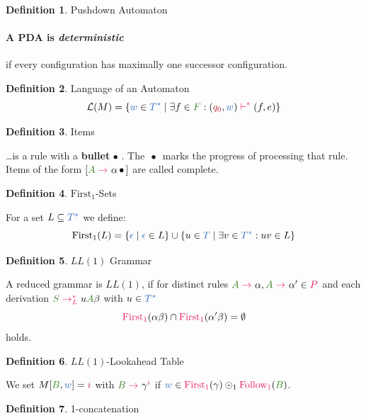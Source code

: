 \documentclass[10pt, landscape]{article}
\theoremstyle{definition}
\newtheorem{definition}{Definition}[section]
\newcommand{\Set}[1]{\textcolor{OliveGreen}{#1}}
\newcommand{\Op}[1]{\textcolor{WildStrawberry}{#1}}
\newcommand{\OneConcat}{\odot_{1}}
\newcommand{\Bul}{\,\bullet\,}
\newcommand{\LangOf}[1]{\mathcal{L} (#1)}
\newcommand{\derive}[1][]{\Op{\;\rightarrow_{#1}\;}}
\newcommand{\derives}[1][]{\Op{\;\rightarrow_{#1}^{*}\;}}
\newcommand{\nontermcolor}{OliveGreen}
\newcommand{\nt}[1]{\textcolor{\nontermcolor}{#1}}
\newcommand{\ntA}{\nt{A}}
\newcommand{\ntB}{\nt{B}}
\newcommand{\ntS}{\nt{S}}
\newcommand{\termcolor}{NavyBlue}
\newcommand{\terms}{\textcolor{\termcolor}{T}}
\newcommand{\termws}{\textcolor{\termcolor}{T^*}}
\newcommand{\termW}{\textcolor{\termcolor}{w}}
\newcommand{\termEps}{\textcolor{\termcolor}{\epsilon}}
\newcommand{\prodcolor}{WildStrawberry}
\newcommand{\prods}{\textcolor{\prodcolor}{P}}
\newcommand{\FollowOne}{\textcolor{\prodcolor}{\text{Follow}_{1}}}
\newcommand{\FirstOne}{\textcolor{\prodcolor}{\text{First}_{1}}}
\newcommand{\steps}{\Op{\;{\vdash}^{*}\;}}
\newcommand{\statecolor}{Maroon}
\newcommand{\stateQ}[1][]{\textcolor{\statecolor}{q_{#1}}}
\newcommand{\stateQZ}{\stateQ[0]}
\begin{document}
\begin{multicols*}{3}
\begin{definition}{Pushdown Automaton}
  \paragraph{A PDA is \textit{deterministic}} if every configuration has maximally one successor configuration.

\end{definition}

\begin{definition}{Language of an Automaton}
  \[
    \LangOf{M} = \{\termW \in \termws \mid \exists f \in \Set{F} : (\stateQZ, \termW) \steps (f, e)\}
  \]
\end{definition}

\begin{definition}{Items}

  \dots is a rule with a \textbf{bullet$\Bul$}. The \textbf{$\Bul$} marks the progress of processing that rule. Items of the form $[\ntA \derive \alpha \Bul]$ are called complete.

\end{definition}

\begin{definition}{$\text{First}_{1}$-Sets}

  For a set $L \subseteq \termws$ we define:
  \[
    \text{First}_{1} (L) = \{\termEps \mid \termEps \in L \} \cup \{u \in \terms \mid \exists v \in \termws : uv \in L\}
  \]
\end{definition}


\begin{definition}{$LL(1)$ Grammar}

  A reduced grammar is $LL(1)$, if for distinct rules $\ntA \derive \alpha, \ntA \derive \alpha' \in \prods$ and each derivation $\ntS \derives[L] u\ntA\beta$ with $u \in \termws$
  \[
    \FirstOne (\alpha\beta) \cap \FirstOne (\alpha'\beta) = \emptyset
  \]
  holds.

\end{definition}

\begin{definition}{$LL (1)$-Lookahead Table}

  We set $M[\ntB, \termW] = \textcolor{Maroon}{i}$ with $\ntB \derive \gamma^{\textcolor{Maroon}{i}}$ if {$\termW \in \FirstOne (\gamma) \OneConcat \FollowOne (\ntB)$}.

\end{definition}

\begin{definition}{1-concatenation}
  {
    \newcommand{\Lang}[1]{
      L_{#1}
    }

}
\end{definition}
\end{multicols*}
\end{document}
